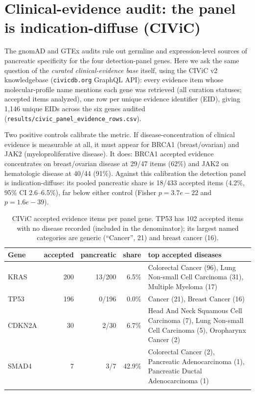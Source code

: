 \section{Clinical-evidence audit: the panel is indication-diffuse (CIViC)}
The gnomAD and GTEx audits rule out germline and expression-level sources of
pancreatic specificity for the four detection-panel genes. Here we ask the same
question of the \emph{curated clinical-evidence base} itself, using the CIViC
v2 knowledgebase (\texttt{civicdb.org} GraphQL API): every evidence item whose
molecular-profile name mentions each gene was retrieved (all curation statuses;
accepted items analyzed), one row per unique evidence identifier (EID), giving
1,146 unique EIDs across the six genes audited
(\texttt{results/civic\_panel\_evidence\_rows.csv}).

Two positive controls calibrate the metric. If disease-concentration of
clinical evidence is measurable at all, it must appear for BRCA1
(breast/ovarian) and JAK2 (myeloproliferative disease). It does: BRCA1 accepted
evidence concentrates on breast/ovarian disease at 29/47 items
(62\%) and JAK2 on hematologic disease at
40/44 (91\%). Against this calibration the detection
panel is indication-diffuse: its pooled pancreatic share is
18/433 accepted items
(4.2\%, 95\% CI 2.6--6.5\%), far below either control
(Fisher $p=3.7e-22$ and $p=1.6e-39$).

\begin{table}[h]\centering\footnotesize
\begin{tabular}{@{}lrrrp{4.9cm}@{}}
\hline
Gene & accepted & pancreatic & share & top accepted diseases \\ \hline
KRAS & 200 & 13/200 & 6.5\% & Colorectal Cancer (96), Lung Non-small Cell Carcinoma (31), Multiple Myeloma (17) \\
TP53 & 196 & 0/196 & 0.0\% & Cancer (21), Breast Cancer (16) \\
CDKN2A & 30 & 2/30 & 6.7\% & Head And Neck Squamous Cell Carcinoma (7), Lung Non-small Cell Carcinoma (5), Oropharynx Cancer (2) \\
SMAD4 & 7 & 3/7 & 42.9\% & Colorectal Cancer (2), Pancreatic Adenocarcinoma (1), Pancreatic Ductal Adenocarcinoma (1) \\ \\ \hline
\end{tabular}
\caption{CIViC accepted evidence items per panel gene. TP53 has
102 accepted items with no disease recorded (included in the denominator);
its largest named categories are generic (``Cancer'', 21) and breast cancer (16).}
\end{table}

